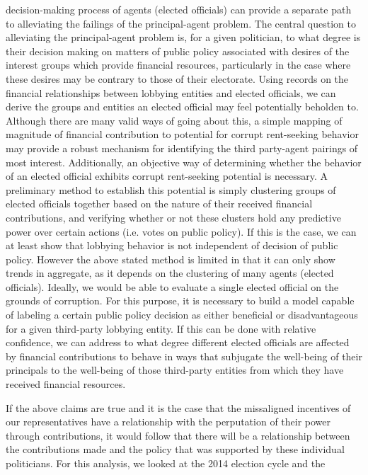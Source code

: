 \documentclass[journal]{IEEEtran}
\begin{document}
decision-making process of agents (elected officials) can provide a separate path to alleviating the failings of the 
principal-agent problem.\newline
  The central question to alleviating the principal-agent problem is, for a given politician, to what degree is their decision 
making on matters of public policy associated with desires of the interest groups which provide financial resources, particularly
in the case where these desires may be contrary to those of their electorate. Using records on the financial relationships between 
lobbying entities and elected officials, we can derive the groups and entities an elected official may feel potentially beholden 
to. Although there are many valid ways of going about this, a simple mapping of magnitude of financial contribution to potential for 
corrupt rent-seeking behavior may provide a robust mechanism for identifying the third party-agent pairings of most interest. 
Additionally, an objective way of determining whether the behavior of an elected official exhibits corrupt rent-seeking potential 
is necessary. A preliminary method to establish this potential is simply clustering groups of elected officials together based 
on the nature of their received financial contributions, and verifying whether or not these clusters hold any predictive power 
over certain actions (i.e. votes on public policy). If this is the case, we can at least show that lobbying behavior is not 
independent of decision of public policy. However the above stated method is limited in that it can only show trends in aggregate, 
as it depends on the clustering of many agents (elected officials). Ideally, we would be able to evaluate a single elected official 
on the grounds of corruption. For this purpose, it is necessary to build a model capable of labeling a certain public policy 
decision as either beneficial or disadvantageous for a given third-party lobbying entity. If this can be done with relative 
confidence, we can address to what degree different elected officials are affected by financial contributions to behave in ways 
that subjugate the well-being of their principals to the well-being of those third-party entities from which they have received 
financial resources.\newline

  If the above claims are true and it is the case that the missaligned incentives of our representatives have a relationship with the 
perputation of their power through contributions, it would follow that there will be a relationship between the contributions made
and the policy that was supported by these individual politicians. For this analysis, we looked at the 2014 election cycle and the 
\end{document}
